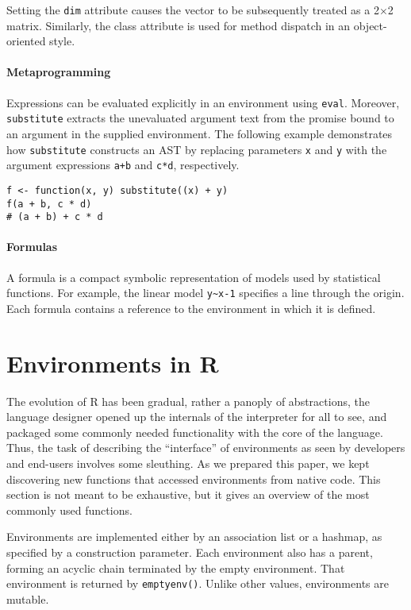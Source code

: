 \documentclass[sigplan,screen]{acmart}
\renewcommand{\c}[1]{\lstinline |#1|\xspace}
\newcommand{\eval}{\c{eval}}
\newcommand{\substitute}{\c{substitute}}
\begin{document}
\noindent
Setting the \c{dim} attribute causes the vector to be subsequently treated as
a 2$\times$2 matrix. Similarly, the class attribute is used for method dispatch
in an object-oriented style.

\paragraph{Metaprogramming}

Expressions can be evaluated explicitly in an
environment using \eval. Moreover, \substitute extracts the unevaluated argument
text from the promise bound to an argument in the supplied environment. The
following example demonstrates how \substitute constructs an AST by replacing
parameters \c{x} and \c{y} with the argument expressions \c{a+b} and \c{c*d},
respectively.

\begin{lstlisting}
f <- function(x, y) substitute((x) + y)
f(a + b, c * d)
# (a + b) + c * d
\end{lstlisting}


\paragraph{Formulas}  A formula is a compact symbolic representation of models
used by statistical functions. For example, the linear model \c{y~x-1}
specifies a line through the origin. Each formula contains a reference to the
environment in which it is defined.

\section{Environments in R}

The evolution of R has been gradual, rather a panoply of abstractions, the
language designer opened up the internals of the interpreter for all to see, and
packaged some commonly needed functionality with the core of the language. Thus,
the task of describing the ``interface'' of environments as seen by developers
and end-users involves some sleuthing. As we prepared this paper, we kept
discovering new functions that accessed environments from native code. This
section is not meant to be exhaustive, but it gives an overview of the most
commonly used functions.

Environments are implemented either by an association list or a hashmap, as
specified by a construction parameter. Each environment also has a parent,
forming an acyclic chain terminated by the empty environment. That environment
is returned by \c{emptyenv()}. Unlike other values, environments are mutable.
\end{document}
